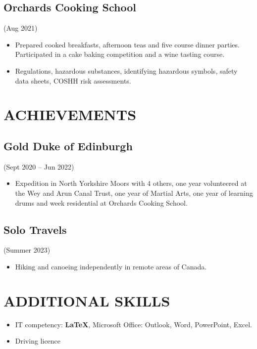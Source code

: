 \documentclass[../main.tex]{subfiles}
\begin{document}
        \subsection*{Orchards Cooking School}(Aug 2021)
        \begin{itemize}
            \item Prepared cooked breakfasts, afternoon teas and five course dinner parties. Participated in a cake baking competition and a wine tasting course.
        \end{itemize}
        \begin{itemize}
            \item Regulations, hazardous substances, identifying hazardous symbols, safety data sheets, COSHH risk assessments.
        \end{itemize}

\section*{ACHIEVEMENTS}

    \subsection*{Gold Duke of Edinburgh}(Sept 2020 – Jun 2022)
    \begin{itemize}
        \item Expedition in North Yorkshire Moors with 4 others, one year volunteered at the Wey and Arun Canal Trust, one year of Martial Arts, one year of learning drums and week residential at Orchards Cooking School.
        \end{itemize}
    \subsection*{Solo Travels}(Summer 2023)
    \begin{itemize}
        \item Hiking and canoeing independently in remote areas of Canada.
    \end{itemize}

\section*{ADDITIONAL SKILLS}

    \begin{itemize}
        \item IT competency: \textbf {LaTeX}, Microsoft Office: Outlook, Word, PowerPoint, Excel.
        \item Driving licence
    \end{itemize}
\end{document}
